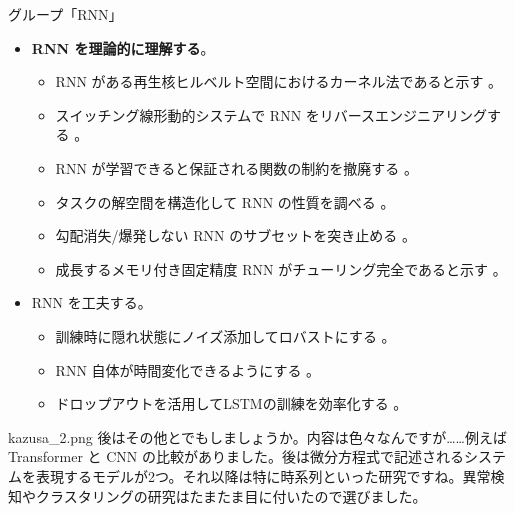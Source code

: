 \documentclass[b5paper,xelatex,ja=standard,10pt]{bxjsarticle}
\begin{document}
\vspace{1pt}
\begin{PROP}[left=0pt]{グループ「RNN」}
\begin{itemize}
  \item \textbf{RNN を理論的に理解する}。
  \begin{itemize}
    \item RNN がある再生核ヒルベルト空間におけるカーネル法であると示す \cite{AdelineFermanian2021}。
    \item スイッチング線形動的システムで RNN をリバースエンジニアリングする \cite{JimmySmith2021}。
    \item RNN が学習できると保証される関数の制約を撤廃する \cite{LifuWang2021} \cite{AbhishekPanigrahi2021}。
    \item タスクの解空間を構造化して RNN の性質を調べる \cite{EliaTurner2021}。
    \item 勾配消失/爆発しない RNN のサブセットを突き止める \cite{ZimingZhang2021}。
    \item 成長するメモリ付き固定精度 RNN がチューリング完全であると示す \cite{StephenChung2021}。
  \end{itemize}
  \vspace{6pt}
  \item RNN を工夫する。
  \begin{itemize}
    \item 訓練時に隠れ状態にノイズ添加してロバストにする \cite{SoonHoeLim2021}。
    \item RNN 自体が時間変化できるようにする \cite{AstonZhang2021}。
    \item ドロップアウトを活用してLSTMの訓練を効率化する \cite{AnupSarma2021}。
  \end{itemize}
\end{itemize}
\end{PROP}
\vspace{1pt}

\begin{SERIFU}[colback=PaleIris, colbacktitle=PaleIris2]{kazusa_2.png}
後はその他とでもしましょうか。内容は色々なんですが……例えば Transformer と CNN の比較がありました。後は微分方程式で記述されるシステムを表現するモデルが2つ。それ以降は特に時系列といった研究ですね。異常検知やクラスタリングの研究はたまたま目に付いたので選びました。
\end{SERIFU}
\end{document}
